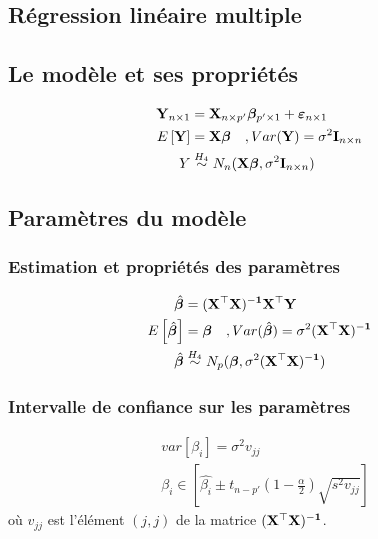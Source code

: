 \documentclass[10pt, french]{article}
\begin{document}
\begin{multicols*}{3}
\section{Régression linéaire multiple}
\subsection*{Le modèle et ses propriétés}
\begin{align*}
\mathbf{Y}_{n \times 1} & = \mathbf{X}_{n \times p'} \bm{\beta}_{p' \times 1} + \bm{\varepsilon}_{n \times 1} \\
E \left[ \mathbf{Y} \right]	& = \mathbf{X} \bm{\beta} \quad , Var(\mathbf{Y}) = \sigma^2 \mathbf{I}_{n \times n} \\
Y & \overset{H_4}{\sim} N_n(\mathbf{X} \bm{\beta}, \sigma^2 \mathbf{I}_{n \times n}) \\
\end{align*}

\subsection*{Paramètres du modèle}
\subsubsection*{Estimation et propriétés des paramètres}
\begin{align*}
\hat{\bm{\beta}} & = \mathbf{(X^\top X)^{-1} X^\top Y} \\
E \left[ \hat{\bm{\beta}} \right]	& = \bm{\beta} \quad , Var(\hat{\bm{\beta}}) = \sigma^2 (\mathbf{X^\top X)^{-1}} \\
\hat{\bm{\beta}} & \overset{H_4}{\sim} N_p(\bm{\beta}, \sigma^2 (\mathbf{X^\top X)^{-1}})
\end{align*}

\subsubsection*{Intervalle de confiance sur les paramètres}
\begin{align*}
&var[\beta_i] = \sigma^2 v_{jj} \\
&\beta_i \in \left[ \hat{\beta_i} \pm t_{n-p'} \left(1- \frac{\alpha}{2} \right) \sqrt{s^2 v_{jj}} \right]
\end{align*}
où $v_{jj}$ est l'élément $(j,j)$ de la matrice $\mathbf{(X^\top X)^{-1}}$.


\end{multicols*}
\end{document}
